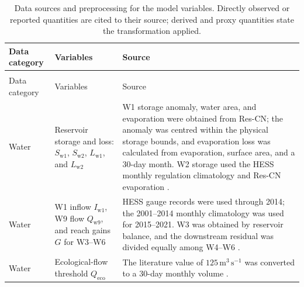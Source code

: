 \documentclass [a4paper,fleqn] {cas-dc}
\begin{document}
\begingroup
\sffamily\footnotesize
\renewcommand{\arraystretch}{1.00}
\setlength{\LTpre}{8pt}
\setlength{\LTpost}{6pt}
\setlength{\LTcapwidth}{\textwidth}
\makeatletter
\long{}
\makeatother
\begin{xltabular}{\textwidth}{@{}>{\raggedright\arraybackslash}p{0.09\textwidth}
  >{\raggedright\arraybackslash}p{0.24\textwidth}
  >{\raggedright\arraybackslash}X@{}}
\caption{Data sources and preprocessing for the model variables. Directly observed or reported quantities are cited to their source; derived and proxy quantities state the transformation applied.}
\label{tab:data-sources} \\
\toprule
Data category & Variables & Source \\
\midrule
\endfirsthead
{} \\
\toprule
Data category & Variables & Source \\
\midrule
\endhead
\midrule
\endfoot
\bottomrule
\endlastfoot
Water & Reservoir storage and loss: $S_{\mathrm{w1}}$, $S_{\mathrm{w2}}$,
$L_{\mathrm{w1}}$, and $L_{\mathrm{w2}}$ & W1 storage anomaly, water area,
and evaporation were obtained from Res-CN; the anomaly was centred within the
physical storage bounds, and evaporation loss was calculated from evaporation,
surface area, and a 30-day month. W2 storage used the HESS monthly regulation
climatology and Res-CN evaporation
\citep{Shen2023ResCN,Shen2022ResCNDataset,Yin2021YellowRiver,Yin2020YellowRiverDataset}. \\

Water & W1 inflow $I_{\mathrm{w1}}$, W9 flow $Q_{\mathrm{w9}}$, and reach gains
$G$ for W3--W6 & HESS gauge records were used through 2014; the 2001--2014
monthly climatology was used for 2015--2021. W3 was obtained by reservoir
balance, and the downstream residual was divided equally among W4--W6
\citep{Yin2021YellowRiver,Yin2020YellowRiverDataset,NingxiaWaterBulletins,Feng2025Hetao}. \\

Water & Ecological-flow threshold $Q_{\mathrm{eco}}$ & The literature value of
$125\,\mathrm{m^3\,s^{-1}}$ was converted to a 30-day monthly volume
\citep{Lu2021EcologicalFlow}. \\


\end{xltabular}
\end{document}
